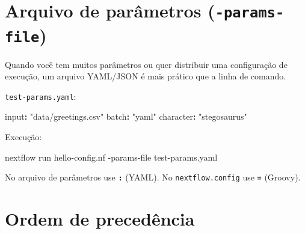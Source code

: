 \documentclass[
  brazilian,
  letterpaper,
  DIV=11,
  numbers=noendperiod]{scrreprt}
\newenvironment{Shaded}{\begin{snugshade}}{\end{snugshade}}
\newcommand{\AttributeTok}[1]{\textcolor[rgb]{0.40,0.45,0.13}{#1}}
\newcommand{\ExtensionTok}[1]{\textcolor[rgb]{0.00,0.23,0.31}{#1}}
\newcommand{\FunctionTok}[1]{\textcolor[rgb]{0.28,0.35,0.67}{#1}}
\newcommand{\KeywordTok}[1]{\textcolor[rgb]{0.00,0.23,0.31}{\textbf{#1}}}
\newcommand{\NormalTok}[1]{\textcolor[rgb]{0.00,0.23,0.31}{#1}}
\newcommand{\StringTok}[1]{\textcolor[rgb]{0.13,0.47,0.30}{#1}}
\begin{document}
\section{\texorpdfstring{Arquivo de parâmetros
(\texttt{-params-file})}{Arquivo de parâmetros (-params-file)}}\label{arquivo-de-paruxe2metros--params-file}

Quando você tem muitos parâmetros ou quer distribuir uma configuração de
execução, um arquivo YAML/JSON é mais prático que a linha de comando.

\texttt{test-params.yaml}:

\begin{Shaded}
\begin{Highlighting}[]
\FunctionTok{input}\KeywordTok{:}\AttributeTok{     }\StringTok{"data/greetings.csv"}
\FunctionTok{batch}\KeywordTok{:}\AttributeTok{     }\StringTok{"yaml"}
\FunctionTok{character}\KeywordTok{:}\AttributeTok{ }\StringTok{"stegosaurus"}
\end{Highlighting}
\end{Shaded}

Execução:

\begin{Shaded}
\begin{Highlighting}[]
\ExtensionTok{nextflow}\NormalTok{ run hello{-}config.nf }\AttributeTok{{-}params{-}file}\NormalTok{ test{-}params.yaml}
\end{Highlighting}
\end{Shaded}

\begin{tcolorbox}[enhanced jigsaw, arc=.35mm, bottomrule=.15mm, bottomtitle=1mm, breakable, colback=white, colbacktitle=quarto-callout-important-color!10!white, colframe=quarto-callout-important-color-frame, coltitle=black, left=2mm, leftrule=.75mm, opacityback=0, opacitybacktitle=0.6, rightrule=.15mm, title=\textcolor{quarto-callout-important-color}{\faExclamation}\hspace{0.5em}{Importante}, titlerule=0mm, toprule=.15mm, toptitle=1mm]

No arquivo de parâmetros use \textbf{\texttt{:}} (YAML). No
\texttt{nextflow.config} use \textbf{\texttt{=}} (Groovy).

\end{tcolorbox}

\section{Ordem de precedência}\label{ordem-de-preceduxeancia}
\end{document}
